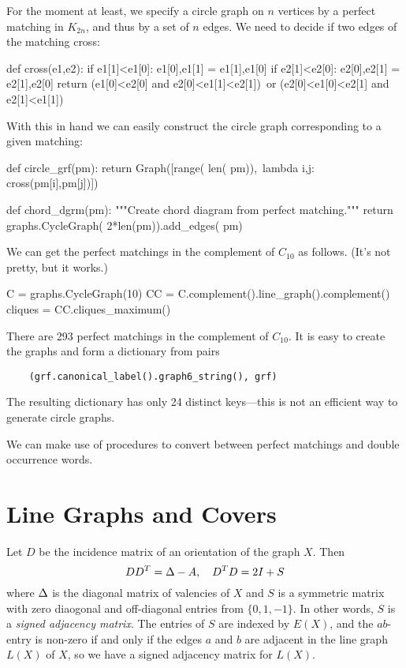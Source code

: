 For the moment at least, we specify a circle graph on $n$ vertices by a 
perfect matching in $K_{2n}$, and thus by a set of $n$ edges.
We need to decide if two edges of the matching cross:
\begin{sageblock}
def cross(e1,e2):
    if e1[1]<e1[0]: e1[0],e1[1] = e1[1],e1[0]
    if e2[1]<e2[0]: e2[0],e2[1] = e2[1],e2[0]
    return (e1[0]<e2[0] and e2[0]<e1[1]<e2[1])\
      or (e2[0]<e1[0]<e2[1] and e2[1]<e1[1])
\end{sageblock}
With this in hand we can easily construct the circle graph corresponding
to a given matching:
\begin{sageblock}
def circle_grf(pm):
    return Graph([range( len( pm)),\
      lambda i,j: cross(pm[i],pm[j])])
\end{sageblock}

\begin{sageblock}
def chord_dgrm(pm):
    """Create chord diagram from perfect matching."""
    return graphs.CycleGraph( 2*len(pm)).add_edges( pm)
\end{sageblock}

We can get the perfect matchings in the complement of $C_{10}$ as follows.
(It's not pretty, but it works.)
\begin{sageblock}
    C = graphs.CycleGraph(10)
    CC = C.complement().line_graph().complement()
    cliques = CC.cliques_maximum()
\end{sageblock}

There are 293 perfect matchings in the complement of $C_{10}$. It is easy
to create the graphs and form a dictionary from pairs
\begin{verbatim}
    (grf.canonical_label().graph6_string(), grf)
\end{verbatim}
The resulting dictionary has only 24 distinct keys---this is not an efficient
way to generate circle graphs.

We can make use of procedures to convert between perfect matchings and double
occurrence words.


\section{Line Graphs and Covers}

Let $D$ be the incidence matrix of an orientation of the graph $X$. Then
\[
    DD^T = \Delta -A,\quad D^TD = 2I +S
\]
where $\Delta$ is the diagonal matrix of valencies of $X$ and $S$ is a symmetric
matrix with zero diaogonal and off-diagonal entries from $\{0,1,-1\}$.
In other words, $S$ is a \textsl{signed adjacency matrix}. The entries of
$S$ are indexed by $E(X)$, and the $ab$-entry is non-zero if and only if
the edges $a$ and $b$ are adjacent in the line graph $L(X)$ of $X$,
so we have a signed adjacency matrix for $L(X)$.

